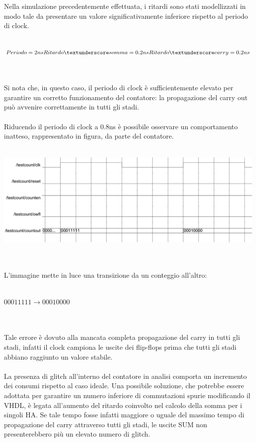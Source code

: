 \documentclass[11pt,  english, makeidx, a4paper, titlepage, oneside]{book}
\begin{document}
Nella simulazione precedentemente effettuata, i ritardi sono stati
modellizzati in modo tale da presentare un valore significativamente
inferiore rispetto al periodo di clock.
\\\\
\centerline{$Periodo = 2ns \\
            Ritardo\textunderscore somma = 0.2ns \\
            Ritardo\textunderscore carry = 0.2ns $}
\\\\
Si nota che, in questo caso, il periodo di clock è 
sufficientemente elevato per garantire un corretto funzionamento 
del contatore: la propagazione del carry out può avvenire correttamente
in tutti gli stadi.
\\\\
Riducendo il periodo di clock a 0.8ns è possibile osservare un
comportamento inatteso, rappresentato in figura, da parte del contatore.
\\\\
\centerline{\includegraphics[width=15cm]{./img/Lab_1/Es_5/Clk_corto.png}}
\\\\
L'immagine mette in luce una transizione da un conteggio all'altro:
\\\\
\centerline{$00011111 \rightarrow 00010000$}
\\\\
Tale errore è dovuto alla mancata completa propagazione del carry in tutti
gli stadi, infatti il clock campiona le uscite dei flip-flops prima che tutti
gli stadi abbiano raggiunto un valore stabile. 
\\\\
La presenza di glitch all'interno del contatore in analisi comporta
un incremento dei consumi rispetto al caso ideale. Una possibile soluzione, che potrebbe
essere adottata per garantire un numero inferiore di commutazioni spurie modificando il VHDL, è legata
all'aumento del ritardo coinvolto nel calcolo della somma per i singoli HA. 
Se tale tempo fosse infatti maggiore o uguale del massimo tempo di propagazione 
del carry attraverso tutti gli stadi, le uscite SUM non presenterebbero più un elevato numero di glitch.
\newpage
\end{document}
